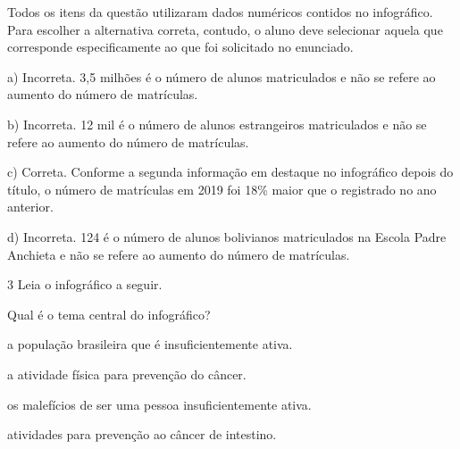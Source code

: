 \begin{escolha}
\begin{escolha}
{Todos os itens da questão utilizaram dados numéricos contidos no 
infográfico. Para escolher a alternativa correta, contudo, o aluno 
deve selecionar aquela que corresponde especificamente ao que foi
solicitado no enunciado. 

a) Incorreta. 3,5 milhões é o número de alunos matriculados e não se 
refere ao aumento do número de matrículas.

b) Incorreta. 12 mil é o número de alunos estrangeiros matriculados
e não se refere ao aumento do número de matrículas.

c) Correta. Conforme a segunda informação em destaque no infográfico
depois do título, o número de matrículas em 2019 foi 18\% maior que o
registrado no ano anterior. 

d)  Incorreta. 124 é o número de alunos bolivianos matriculados na 
Escola Padre Anchieta e não se refere ao aumento do número de matrículas.}

\num{3} Leia o infográfico a seguir.



Qual é o tema central do infográfico?

\begin{escolha}
\item a população brasileira que é insuficientemente ativa.

\item a atividade física para prevenção do câncer.

\item os malefícios de ser uma pessoa insuficientemente ativa.

\item atividades para prevenção ao câncer de intestino.
\end{escolha}

\end{escolha}
\end{escolha}
